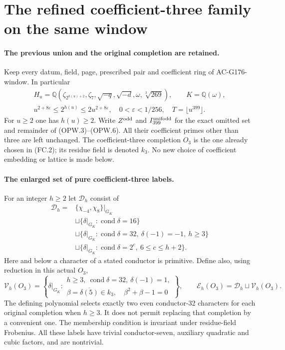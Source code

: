 \section{The refined coefficient-three family on the same window}
\label{sec:coefficient-three-refined-window}

\paragraph{The previous union and the original completion are retained.}
Keep every datum, field, page, prescribed pair and coefficient ring
of AC-G176-window.  In particular
\[
 \begin{gathered}
 H_u=\mathbb Q(\zeta_{2^{h(u)+2}},\zeta_7,
             \sqrt{-q},\sqrt{-d},\omega,\sqrt[3]{269}),\qquad
 K=\mathbb Q(\omega),\\
 u^{2+8\varepsilon}\leq2^{h(u)}\leq2u^{2+8\varepsilon},
 \quad 0<\varepsilon<1/256,\quad T=\lfloor u^{399}\rfloor.
 \end{gathered}\tag{R3W.1}
\]
For $u\geq2$ one has $h(u)\geq2$.
Write $Z^{\rm odd}$ and $I_{399}^{\rm unifodd}$ for the exact
omitted set and remainder of (OPW.3)--(OPW.6).
All their coefficient primes other than three are left unchanged.
The coefficient-three completion $O_3$ is the one already chosen
in (FC.2); its residue field is denoted $k_3$.
No new choice of coefficient embedding or lattice is made below.

\paragraph{The enlarged set of pure coefficient-three labels.}
For an integer $h\geq2$ let $\mathscr D_h$ consist of
\[
 \begin{split}
 \mathscr D_h={}&\{\chi_{-4},\chi_8\}|_{G_K}\\
 &\sqcup\{\delta|_{G_K}:\operatorname{cond}\delta=16\}\\
 &\sqcup\{\delta|_{G_K}:\operatorname{cond}\delta=32,
                      \ \delta(-1)=-1,\ h\geq3\}\\
 &\sqcup\{\delta|_{G_K}:\operatorname{cond}\delta=2^c,
                                      \ 6\leq c\leq h+2\}.
 \end{split}\tag{R3W.2}
\]
Here and below a character of a stated conductor is primitive.
Define also, using reduction in this actual $O_3$,
\[
 \mathscr V_h(O_3)=
 \left\{\delta|_{G_K}:\begin{array}{l}
 h\geq3,\ \operatorname{cond}\delta=32,\ \delta(-1)=1,\\
 \beta=\overline{\delta(5)}\in k_3,\quad\beta^2+\beta-1=0
 \end{array}\right\},\qquad
 \mathscr E_h(O_3)=\mathscr D_h\sqcup\mathscr V_h(O_3).
 \tag{R3W.3}
\]
The defining polynomial selects exactly two even conductor-32
characters for each original completion when $h\geq3$.
It does not permit replacing that completion by a convenient one.
The membership condition is invariant under residue-field Frobenius.
All these labels have trivial conductor-seven, auxiliary quadratic
and cubic factors, and are nontrivial.

